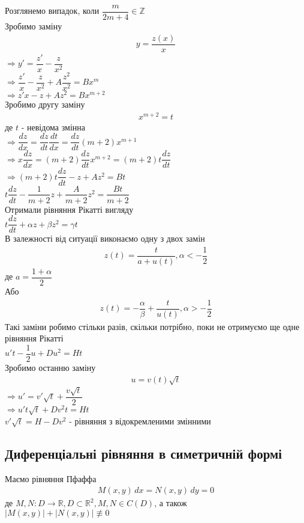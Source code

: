 \documentclass[a4paper, 10pt]{article}
\theoremstyle{theoremdd}
\theoremstyle{theoremdd}
\theoremstyle{theoremdd}
\theoremstyle{theoremdd}
\theoremstyle{theoremdd}
\theoremstyle{theoremdd}
\theoremstyle{theoremdd}
\theoremstyle{theoremdd}
\begin{document}
Розглянемо випадок, коли $\dfrac{m}{2m+4} \in \mathbb{Z}$\\
Зробимо заміну
\begin{align*}
y = \dfrac{z(x)}{x}
\end{align*}
$\Rightarrow y' = \dfrac{z'}{x} - \dfrac{z}{x^2}$\\
$\Rightarrow \dfrac{z'}{x} - \dfrac{z}{x^2} + A \dfrac{z^2}{x^2} = Bx^m$\\
$\Rightarrow z'x - z + Az^2 = Bx^{m+2}$\\
Зробимо другу заміну
\begin{align*}
x^{m+2} = t
\end{align*}
де $t$ - невідома змінна\\
$\Rightarrow \dfrac{dz}{dx} = \dfrac{dz}{dt} \dfrac{dt}{dx} = \dfrac{dz}{dt} (m+2)x^{m+1}$\\
$\Rightarrow x \dfrac{dz}{dx} = (m+2) \dfrac{dz}{dt} x^{m+2} = (m+2)t \dfrac{dz}{dt}$\\
$\Rightarrow (m+2)t \dfrac{dz}{dt} - z + Az^2 = Bt$\\
$t \dfrac{dz}{dt} - \dfrac{1}{m+2}z + \dfrac{A}{m+2}z^2 = \dfrac{Bt}{m+2}$\\
Отримали рівняння Рікатті вигляду\\
$t \dfrac{dz}{dt} + \alpha z + \beta z^2 = \gamma t$\\
В залежності від ситуації виконаємо одну з двох замін
\begin{align*}
z(t) = \dfrac{t}{a+u(t)}, \alpha < -\dfrac{1}{2}
\end{align*}
де $a = \dfrac{1+\alpha}{2}$\\
Або
\begin{align*}
z(t) = -\dfrac{\alpha}{\beta} + \dfrac{t}{u(t)}, \alpha > -\dfrac{1}{2}
\end{align*}
Такі заміни робимо стільки разів, скільки потрібно, поки не отримуємо ще одне рівняння Рікатті\\
$u't - \dfrac{1}{2}u + Du^2 = Ht$\\
Зробимо останню заміну
\begin{align*}
u = v(t) \sqrt{t}
\end{align*}
$\Rightarrow u' = v' \sqrt{t} + \dfrac{v \sqrt{t}}{2}$\\
$\Rightarrow u' t \sqrt{t} + Dv^2t = Ht$\\
$v' \sqrt{t} = H - Dv^2$ - рівняння з відокремленими змінними
\bigskip \\

\subsection{Диференціальні рівняння в симетричній формі}
Маємо рівняння Пфаффа
\begin{align*}
M(x,y)\,dx = N(x,y)\,dy = 0
\end{align*}
де $M,N: D \to \mathbb{R}, D \subset \mathbb{R}^2, M,N \in C(D)$, а також\\
$|M(x,y)|+|N(x,y)| \not\equiv 0$
\end{document}
